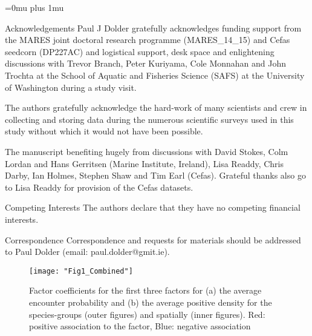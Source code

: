 \documentclass{nature}
\begin{document}
\newpage
\Urlmuskip=0mu plus 1mu\relax

\small{}


\newpage


\begin{addendum}
 \item [Acknowledgements] Paul J Dolder gratefully acknowledges funding support
	 from the MARES joint doctoral research programme (MARES\_14\_15) and
	 Cefas seedcorn (DP227AC) and logistical support, desk space and
	 enlightening discussions with Trevor Branch, Peter Kuriyama, Cole
	 Monnahan  and John Trochta at the School of Aquatic and Fisheries
	 Science (SAFS) at the University of Washington during a study visit.
	 
	 The authors gratefully acknowledge the hard-work of many scientists
	 and crew in collecting and storing data during the numerous scientific
	 surveys used in this study without which it would not have been
	 possible.  
	 
	 The manuscript benefiting hugely from discussions with David Stokes,
	 Colm Lordan and Hans Gerritsen (Marine Institute, Ireland), Lisa
	 Readdy, Chris Darby, Ian Holmes, Stephen Shaw and Tim Earl (Cefas).
	 Grateful thanks also go to Lisa Readdy for provision of the Cefas
	 datasets.

 \item[Competing Interests] The authors declare that they have
	 no competing financial interests.
 \item[Correspondence] Correspondence and requests for materials
 should be addressed to Paul Dolder (email: paul.dolder@gmit.ie).
 \end{addendum}



\begin{figure}
\begin{center}
	\texttt{[image: "Fig1\_Combined"]}
	\label{fig:1}
	\caption{Factor coefficients for the first three factors for (a) the
		average encounter probability and (b) the average positive
		density for the species-groups (outer figures) and spatially
		(inner figures).  Red: positive association to the factor,
		Blue: negative association}
\end{center}
\end{figure}
\end{document}
